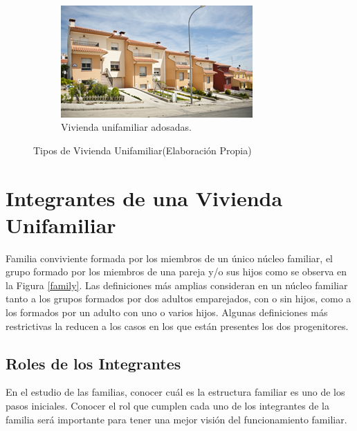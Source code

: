 \documentclass[11pt,letterpaper]{report}
\begin{document}
\begin{figure}[ht]
    ~ %
    \begin{subfigure}[b]{0.5\textwidth}
        \includegraphics[width=\textwidth]{imagenes/adosada.png}
        \caption{Vivienda unifamiliar adosadas. }
        \label{fig:adosada}
    \end{subfigure}
    \caption{Tipos de Vivienda Unifamiliar(Elaboración Propia)}\label{fig:viviendas}
\end{figure}

	\section{Integrantes de una Vivienda Unifamiliar}
	Familia conviviente formada por los miembros de un único núcleo familiar, el grupo formado por los miembros de una pareja y/o sus hijos como se observa en la Figura \ref{family}. Las definiciones más amplias consideran en un núcleo familiar tanto a los grupos formados por dos adultos emparejados, con o sin hijos, como a los formados por un adulto con uno o varios hijos. Algunas definiciones más restrictivas la reducen a los casos en los que están presentes los dos progenitores.
	
	\subsection{Roles de los Integrantes}
	En el estudio de las familias, conocer cuál es la estructura familiar es uno de los pasos iniciales. Conocer el rol que cumplen cada uno de los integrantes de la familia será importante para tener una mejor visión del funcionamiento familiar.
	
\end{document}
